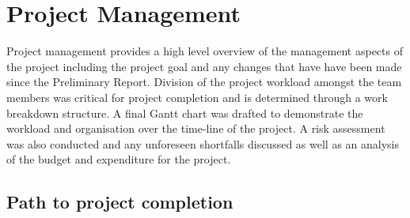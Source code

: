 \documentclass[main.tex]{subfiles}
\begin{document}
\chapter{Project Management}

Project management provides a high level overview of the management aspects of the project including the project goal and any changes that have have been made since the Preliminary Report. Division of the project workload amongst the team members was critical for project completion and is determined through a work breakdown structure. A final Gantt chart was drafted to demonstrate the workload and organisation over the time-line of the project. A risk assessment was also conducted and any unforeseen shortfalls discussed as well as an analysis of the budget and expenditure for the project.

\section{Path to project completion}
\end{document}

